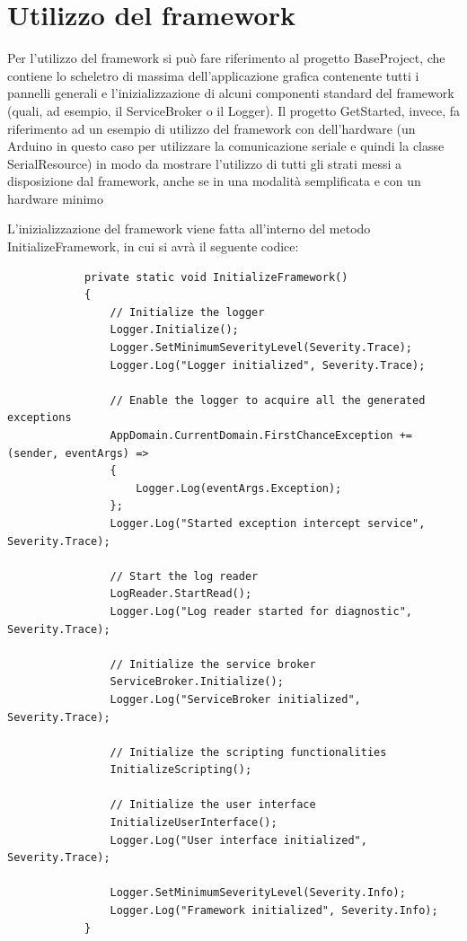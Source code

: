 \documentclass{article}
\begin{document}
	\newpage
	
	\section{Utilizzo del framework} \label{section:Utilizzo}
		Per l'utilizzo del framework si può fare riferimento al progetto BaseProject, che contiene lo scheletro di massima dell'applicazione grafica contenente tutti i pannelli generali e l'inizializzazione di alcuni componenti standard del framework (quali, ad esempio, il ServiceBroker o il Logger). Il progetto GetStarted, invece, fa riferimento ad un esempio di utilizzo del framework con dell'hardware (un Arduino in questo caso per utilizzare la comunicazione seriale e quindi la classe SerialResource) in modo da mostrare l'utilizzo di tutti gli strati messi a disposizione dal framework, anche se in una modalità semplificata e con un hardware minimo
		\par
		L'inizializzazione del framework viene fatta all'interno del metodo InitializeFramework, in cui si avrà il seguente codice:
		
		\begin{lstlisting}
			private static void InitializeFramework()
			{
				// Initialize the logger
				Logger.Initialize();
				Logger.SetMinimumSeverityLevel(Severity.Trace);
				Logger.Log("Logger initialized", Severity.Trace);
				
				// Enable the logger to acquire all the generated exceptions
				AppDomain.CurrentDomain.FirstChanceException += (sender, eventArgs) =>
				{
					Logger.Log(eventArgs.Exception);
				};
				Logger.Log("Started exception intercept service", Severity.Trace);
				
				// Start the log reader
				LogReader.StartRead();
				Logger.Log("Log reader started for diagnostic", Severity.Trace);
				
				// Initialize the service broker
				ServiceBroker.Initialize();
				Logger.Log("ServiceBroker initialized", Severity.Trace);
				
				// Initialize the scripting functionalities
				InitializeScripting();
				
				// Initialize the user interface
				InitializeUserInterface();
				Logger.Log("User interface initialized", Severity.Trace);
				
				Logger.SetMinimumSeverityLevel(Severity.Info);
				Logger.Log("Framework initialized", Severity.Info);
			}
		\end{lstlisting}
	
\end{document}
